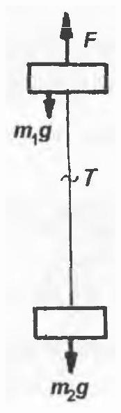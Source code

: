 \documentclass[10pt]{article}
\begin{document}
\includegraphics[max width=\textwidth, center]{2025_07_01_5b3ff9fa0d508c8e9f17g-217}
\end{document}
